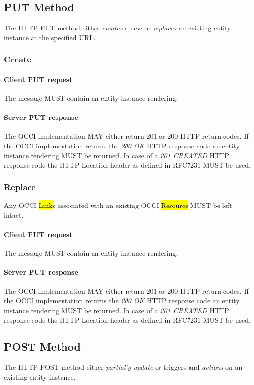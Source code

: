 \documentclass[10pt,a4paper]{article}
\begin{document}
\subsection{PUT Method}
The HTTP PUT method either {\em creates} a new or {\em replaces} an existing entity instance at the specified URL.

\subsubsection{Create}

\paragraph{Client PUT request}
The message MUST contain an entity instance rendering.

\paragraph{Server PUT response}
The OCCI implementation MAY either return 201 or 200 HTTP return codes. If the OCCI implementation
returns the \emph{200 OK} HTTP response code an entity instance rendering MUST be returned.
In case of a \emph{201 CREATED} HTTP response code the HTTP Location header as defined in RFC7231 \cite{rfc7231} MUST be used.

\subsubsection{Replace}
Any OCCI \hl{Link}s associated with an existing OCCI \hl{Resource} MUST be left intact.

\paragraph{Client PUT request}
The message MUST contain an entity instance rendering.

\paragraph{Server PUT response}
The OCCI implementation MAY either return 201 or 200 HTTP return codes.  If the OCCI implementation
returns the \emph{200 OK} HTTP response code an entity instance rendering MUST be returned.
In case of a \emph{201 CREATED} HTTP response code the HTTP Location header as defined in RFC7231 \cite{rfc7231} MUST be used.

\subsection{POST Method}
The HTTP POST method either {\em partially update} or triggers and {\em actions} on an existing entity instance.
\end{document}
